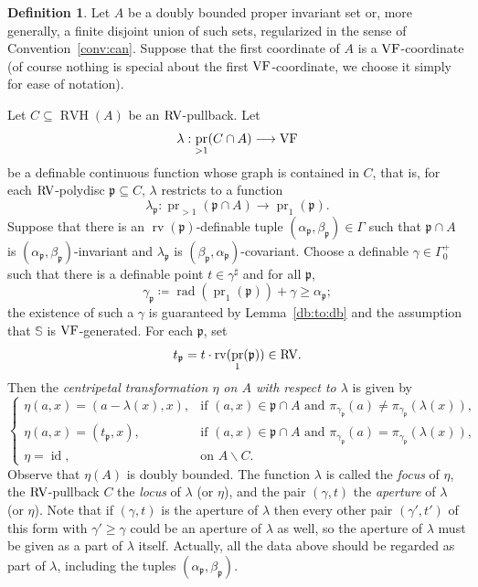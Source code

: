 \documentclass[12pt]{amsart}
\newcommand{\memph}[1]{{\color{magenta}\emph{#1}}}
\theoremstyle{plain}
\theoremstyle{definition}
\newtheorem{defn}[thm]{Definition}
\theoremstyle{remark}
\numberwithin{equation}{section}
\theoremstyle{plain}
\newcommand{\VF}{\textup{VF}}
\newcommand{\RV}{\textup{RV}}
\DeclareMathOperator{\id}{id}
\DeclareMathOperator{\pr}{pr}
\newcommand{\gp}{\mathfrak{p}}
\newcommand{\0}{\emptyset}
\newcommand{\fun}{\longrightarrow}
\newcommand{\sub}{\subseteq}
\newcommand{\mi}{\smallsetminus}
\DeclareMathOperator{\rv}{rv}
\DeclareMathOperator{\rad}{rad}
\DeclareMathOperator{\RVH}{RVH}
\begin{document}
\begin{defn}\label{defn:special:bijection}
Let $A$ be a doubly bounded proper invariant set  or, more generally, a finite disjoint union of such sets,  regularized in the sense of  Convention~\ref{conv:can}. Suppose that the first coordinate of $A$ is a $\VF$-coordinate (of course nothing is special about the first $\VF$-coordinate, we choose it simply for ease of notation).

Let $C \sub \RVH(A)$ be an $\RV$-pullback. Let
\[
\lambda: \pr_{>1}(C \cap A) \fun \VF
\]
be a definable continuous function whose graph is contained in $C$, that is, for each $\RV$-polydisc $\gp \sub C$, $\lambda$ restricts to a function
\[
\lambda_{\gp} : \pr_{>1}(\gp \cap A) \fun \pr_{1}(\gp).
\]
Suppose that there is an $\rv(\gp)$-definable tuple $(\alpha_{\gp}, \beta_{\gp}) \in \Gamma$ such that $\gp \cap A$ is $(\alpha_{\gp}, \beta_{\gp})$-invariant and $\lambda_{\gp}$ is  $(\beta_{\gp}, \alpha_{\gp})$-covariant. Choose a definable $\gamma \in \Gamma^+_0$  such that there is a definable point $t \in \gamma^\sharp$ and for all $\gp$,
\[
\gamma_{\gp} \coloneqq \rad(\pr_{1}(\gp)) + \gamma \geq \alpha_{\gp};
\]
the existence of such a $\gamma$ is guaranteed by Lemma~\ref{db:to:db} and the assumption that $\mathbb{S}$ is $\VF$-generated. For each $\gp$,  set
\[
t_{\gp} = t \cdot \rv(\pr_{1}(\gp)) \in \RV.
\]
Then the \memph{centripetal transformation $\eta$ on $A$ with respect to $\lambda$} is given by
\begin{equation*}\tag{CT}\label{centri}
\begin{cases}
  \eta (a, x) = (a - \lambda(x), x), & \text{if } (a, x) \in \gp \cap A \text{ and } \pi_{\gamma_{\gp}}(a) \neq \pi_{\gamma_{\gp}}(\lambda(x)),\\
  \eta (a, x) = (t_\gp, x), & \text{if } (a, x) \in \gp \cap A \text{ and } \pi_{\gamma_{\gp}}(a) = \pi_{\gamma_{\gp}}(\lambda(x)),\\
  \eta = \id, & \text{on } A \mi C.
\end{cases}
\end{equation*}
Observe that $\eta(A)$ is doubly bounded. The function $\lambda$ is called the \memph{focus} of $\eta$, the $\RV$-pullback $C$  the \memph{locus} of $\lambda$ (or $\eta$), and the pair $(\gamma, t)$   the \memph{aperture} of $\lambda$ (or $\eta$). Note that if $(\gamma, t)$ is the aperture of $\lambda$ then every other pair $(\gamma', t')$
of this form with $\gamma' \geq \gamma$ could be an aperture of $\lambda$ as well, so the aperture of $\lambda$ must be given as a part of $\lambda$ itself. Actually, all the data above should be regarded as part of $\lambda$, including the tuples $(\alpha_{\gp}, \beta_{\gp})$.


\end{defn}
\end{document}
